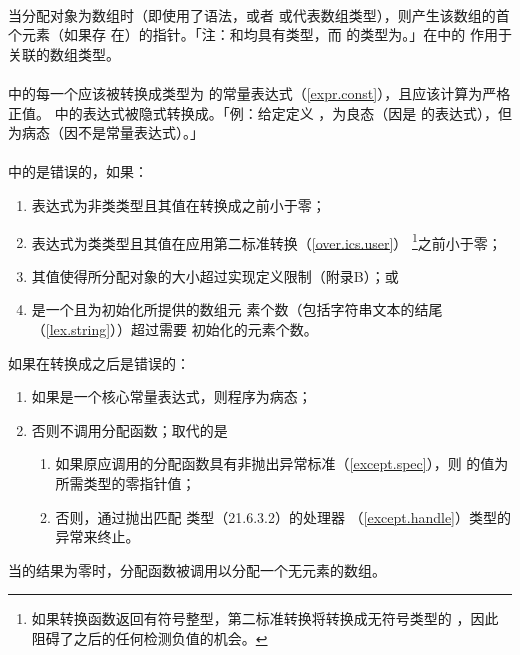 \paragraph{}
当分配对象为数组时（即使用了语法，或者
或代表数组类型），则产生该数组的首个元素（如果存
在）的指针。「注：和均具有类型，而
的类型为。」在中的
作用于关联的数组类型。

\paragraph{}
中的每一个应该被转换成类型为
的常量表达式（\ref{expr.const}），且应该计算为严格正值。
中的表达式被隐式转换成。「例：给定定义
，为良态（因是
的表达式），但为病态（因不是常量表达式）。」

\paragraph{}
中的是错误的，如果：
\begin{enumerate}
  \item{表达式为非类类型且其值在转换成之前小于零；}
  \item{表达式为类类型且其值在应用第二标准转换（\ref{over.ics.user}）
    \footnote{如果转换函数返回有符号整型，第二标准转换将转换成无符号类型的
    ，因此阻碍了之后的任何检测负值的机会。}之前小于零；}
  \item{其值使得所分配对象的大小超过实现定义限制（附录B）；或}
  \item{是一个且为初始化所提供的数组元
    素个数（包括字符串文本的结尾\tm{\sq\bs{}0\sq}（\ref{lex.string}））超过需要
    初始化的元素个数。}
\end{enumerate}
如果在转换成之后是错误的：
\begin{enumerate}
  \item{如果是一个核心常量表达式，则程序为病态；}
  \item{否则不调用分配函数；取代的是
    \begin{enumerate}
      \item{如果原应调用的分配函数具有非抛出异常标准（\ref{except.spec}），则
        的值为所需类型的零指针值；}
      \item{否则，通过抛出匹配
        类型（21.6.3.2）的处理器
        （\ref{except.handle}）类型的异常来终止。}
    \end{enumerate}}
\end{enumerate}
当的结果为零时，分配函数被调用以分配一个无元素的数组。

